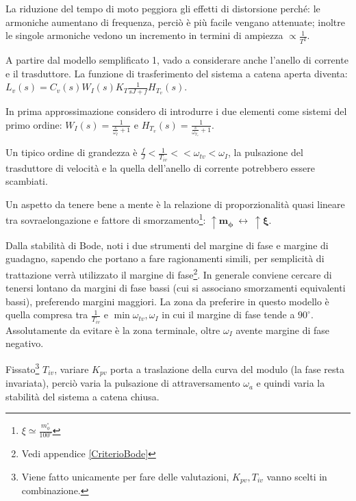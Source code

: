 La riduzione del tempo di moto peggiora gli effetti di distorsione perché: le armoniche aumentano di frequenza, perciò è più facile vengano attenuate; inoltre le singole armoniche vedono un incremento in termini di ampiezza \(\propto \frac{1}{T^2}\).

A partire dal modello semplificato 1, vado a considerare anche l'anello di corrente e il trasduttore.
La funzione di trasferimento del sistema a catena aperta diventa: \(L_v(s)=C_v(s)W_I(s)K_T \frac{1}{sJ+f}H_{T_v}(s)\).

In prima approssimazione considero di introdurre i due elementi come sistemi del primo ordine: \(W_I(s) = \frac{1}{\frac{s}{\omega_I}+1}\) e \(H_{T_v}(s) = \frac{1}{\frac{s}{\omega_{T_v}}+1}\).

Un tipico ordine di grandezza è \(\frac{f}{J} < \frac{1}{T_{iv}} << \omega_{tv} < \omega_I\), la pulsazione del trasduttore di velocità e la quella dell'anello di corrente potrebbero essere scambiati.

Un aspetto da tenere bene a mente è la relazione di proporzionalità quasi lineare tra sovraelongazione e fattore di smorzamento\footnote{\(\xi \simeq \frac{m_\phi^\circ}{100^\circ}\)}: \(\uparrow \mathbf{m_\phi} \ \leftrightarrow \ \uparrow \boldsymbol{\xi}\).

Dalla stabilità di Bode, noti i due strumenti del margine di fase e margine di guadagno, sapendo che portano a fare ragionamenti simili, per semplicità di trattazione verrà utilizzato il margine di fase\footnote{Vedi appendice \ref{CriterioBode}}.
In generale conviene cercare di tenersi lontano da margini di fase bassi (cui si associano smorzamenti equivalenti bassi), preferendo margini maggiori. La zona da preferire in questo modello è quella compresa tra \(\frac{1}{T_{iv}}\) e \(\min{\omega_{tv},\omega_I}\) in cui il margine di fase tende a \(90^\circ\). Assolutamente da evitare è la zona terminale, oltre \(\omega_I\) avente margine di fase negativo.

Fissato\footnote{Viene fatto unicamente per fare delle valutazioni, \(K_{pv}, T_{iv}\) vanno scelti in combinazione.} \(T_{iv}\), variare \(K_{pv}\) porta a traslazione della curva del modulo (la fase resta invariata), perciò varia la pulsazione di attraversamento \(\omega_a\) e quindi varia la stabilità del sistema a catena chiusa.

